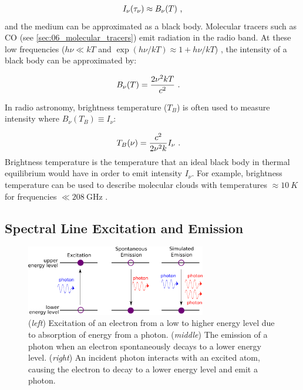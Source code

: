 \begin{equation}
    \begin{aligned}
        I_\nu\qty(\tau_\nu)\approx B_\nu\qty(T) \text{ ,}
    \end{aligned}
\end{equation}
\noindent and the medium can be approximated as a black body. Molecular tracers such as CO (see \autoref{sec:06_molecular_tracers}) emit radiation in the radio band. At these low frequencies ($h\nu\ll kT$ and $\exp(h\nu/kT)\approx1+h\nu/kT$) , the intensity of a black body can be approximated by:

\begin{equation}
    \begin{aligned}
        B_\nu\qty(T)&=\frac{2\nu^2kT}{c^2}\text{ .}
    \end{aligned}
\end{equation}

In radio astronomy, brightness temperature ($T_B$) is often used to measure intensity where $B_\nu(T_B)\equiv I_\nu$:

\begin{equation}
    \begin{aligned}
        T_B\qty(\nu)&=\frac{c^2}{2\nu^2 k}I_\nu\text{ .}
    \end{aligned} \label{eq:chapter_6_brightness_temp}
\end{equation}
\noindent Brightness temperature is the temperature that an ideal black body in thermal equilibrium would have in order to emit intensity $I_\nu$. For example, brightness temperature can be used to describe molecular clouds with temperatures $\approx 10~\si{K}$ for frequencies $\ll 208~\si{\giga\hertz}$ \citep{2011hea..book.....L}.

\subsection{Spectral Line Excitation and Emission} \label{sec:interstellar_medium_excitation_emission}

\begin{figure}[h]
	\centering
	\includegraphics[width=0.7\textwidth]{06_Interstellar_Medium/Images/Theory/emission.png}
	\caption{(\textit{left}) Excitation of an electron from a low to higher energy level due to absorption of energy from a photon. (\textit{middle}) The emission of a photon when an electron spontaneously decays to a lower energy level. (\textit{right}) An incident photon interacts with an excited atom, causing the electron to decay to a lower energy level and emit a photon.}
	\label{fig:absorption_emission}
\end{figure}

